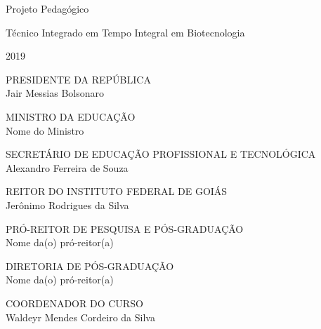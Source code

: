 \documentclass[11pt,fleqn]{book} %
\newcommand{\VER}[1]{\begingroup\color{red}#1\endgroup}
\begin{document}
\let\cleardoublepage\clearpage

\renewcommand{\chaptername}{Capítulo}
\renewcommand{\figurename}{Fig.}

\begingroup
	\thispagestyle{empty}
	
	
	
	
	\vspace*{4.5cm}
	
	\centering
	\par
	{\Huge Projeto Pedagógico}\vspace*{1.5cm}
	\par
	\fontsize{40}{40}
	\selectfont
	Técnico Integrado em Tempo Integral em Biotecnologia\vspace*{10cm}
	\par
	{\Huge 2019}
	\par
\endgroup
\pagebreak

\begin{center}
	\par
	{\large PRESIDENTE DA REPÚBLICA \\ Jair Messias Bolsonaro}\vspace*{1cm}
	\par
	{\large MINISTRO DA EDUCAÇÃO \\ \VER{Nome do Ministro} }\vspace*{1cm}
	\par
	{\large SECRETÁRIO DE EDUCAÇÃO PROFISSIONAL E TECNOLÓGICA \\ Alexandro Ferreira de Souza}\vspace*{1cm}
	\par
	{\large REITOR DO INSTITUTO FEDERAL DE GOIÁS \\ Jerônimo Rodrigues da Silva}\vspace*{1cm}
	\par
	{\large PRÓ-REITOR DE PESQUISA E PÓS-GRADUAÇÃO \\ \VER{Nome da(o) pró-reitor(a)} }\vspace*{1cm}
	\par
	{\large DIRETORIA DE PÓS-GRADUAÇÃO \\ \VER{Nome da(o) pró-reitor(a)} }\vspace*{1cm}
	\par
	{\large COORDENADOR DO CURSO \\ Waldeyr Mendes Cordeiro da Silva}\vspace*{1cm}
\end{center}
\end{document}
